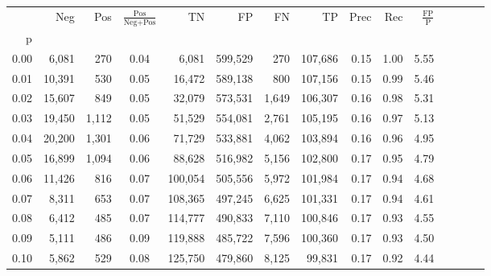 \begin{tabular}{rrrcrrrrrrrrrrr}
\toprule
{} &     Neg &    Pos & $\frac{\text{Pos}}{\text{Neg}+\text{Pos}}$ &       TN &       FP &       FN &       TP &  Prec &   Rec & $\frac{\text{FP}}{\text{P}}$ \\
p    &         &        &                                            &          &          &          &          &       &       &                              \\
\midrule
0.00 &   6,081 &    270 &                                       0.04 &    6,081 &  599,529 &      270 &  107,686 &  0.15 &  1.00 &                         5.55 \\
0.01 &  10,391 &    530 &                                       0.05 &   16,472 &  589,138 &      800 &  107,156 &  0.15 &  0.99 &                         5.46 \\
0.02 &  15,607 &    849 &                                       0.05 &   32,079 &  573,531 &    1,649 &  106,307 &  0.16 &  0.98 &                         5.31 \\
0.03 &  19,450 &  1,112 &                                       0.05 &   51,529 &  554,081 &    2,761 &  105,195 &  0.16 &  0.97 &                         5.13 \\
0.04 &  20,200 &  1,301 &                                       0.06 &   71,729 &  533,881 &    4,062 &  103,894 &  0.16 &  0.96 &                         4.95 \\
0.05 &  16,899 &  1,094 &                                       0.06 &   88,628 &  516,982 &    5,156 &  102,800 &  0.17 &  0.95 &                         4.79 \\
0.06 &  11,426 &    816 &                                       0.07 &  100,054 &  505,556 &    5,972 &  101,984 &  0.17 &  0.94 &                         4.68 \\
0.07 &   8,311 &    653 &                                       0.07 &  108,365 &  497,245 &    6,625 &  101,331 &  0.17 &  0.94 &                         4.61 \\
0.08 &   6,412 &    485 &                                       0.07 &  114,777 &  490,833 &    7,110 &  100,846 &  0.17 &  0.93 &                         4.55 \\
0.09 &   5,111 &    486 &                                       0.09 &  119,888 &  485,722 &    7,596 &  100,360 &  0.17 &  0.93 &                         4.50 \\
0.10 &   5,862 &    529 &                                       0.08 &  125,750 &  479,860 &    8,125 &   99,831 &  0.17 &  0.92 &                         4.44 \\

\end{tabular}
